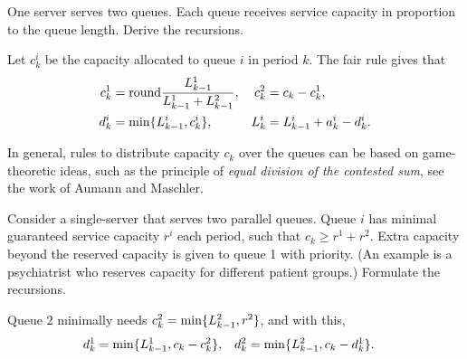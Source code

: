 \begin{exercise} \label{ex:51}
 One server serves two queues. 
 Each queue receives service capacity in proportion to the queue length.
 Derive the recursions.
\begin{solution}
 Let $c_k^i$ be the capacity allocated to queue $i$ in period $k$. The fair rule gives that 
 \begin{align*}
 c_k^1 &= \text{round} \frac{L_{k-1}^1}{L_{k-1}^1 + L_{k-1}^2}, &  c_k^2 &= c_k - c_k^1, \\ 
 d_k^i &= \min\{L_{k-1}^i, c^i_k\}, & L_k^i &= L_{k-1}^i+a_k^i - d_k^i.
 \end{align*}

 In general, rules to distribute capacity $c_k$ over the queues can be based on game-theoretic ideas, such as the principle of \textit{equal division of the contested sum}, see the work of  Aumann and Maschler.
\end{solution}
\end{exercise}




\begin{exercise}
 Consider  a single-server that serves two parallel queues.
Queue $i$ has minimal guaranteed service capacity $r^i$ each  period, such that $c_k \geq r^1 + r^2$.
 Extra capacity beyond the reserved capacity is given to queue 1 with priority.
(An example is a psychiatrist who reserves capacity for different  patient groups.)
 Formulate the recursions.
\begin{solution}
  Queue $2$ minimally needs $c_{k}^2 = \min\{L_{k-1}^2, r^2\}$, and with this,
  \begin{align*}
 d_{k}^1 &= \min\{L_{k-1}^1, c_k-c_{k}^2\}, & d_{k}^2 &= \min\{L_{k-1}^2, c_k-d_{k}^1\}.
  \end{align*}
\end{solution}
\end{exercise}


